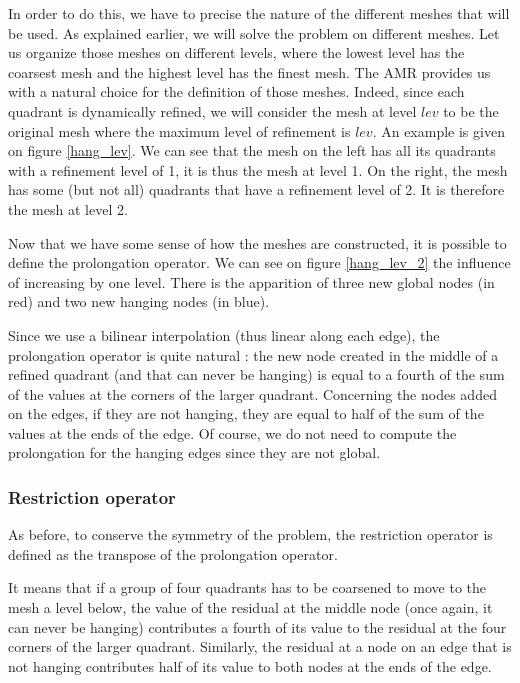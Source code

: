 In order to do this, we have to precise the nature of the different meshes that will be used. As explained earlier, we will solve the problem on different meshes. Let us organize those meshes on different levels, where the lowest level has the coarsest mesh and the highest level has the finest mesh.  The AMR provides us with a natural choice for the definition of those meshes. Indeed, since each quadrant is dynamically refined, we will consider the mesh at level $lev$ to be the original mesh where the maximum level of refinement is $lev$. An example is given on figure \ref{hang_lev}. We can see that the mesh on the left has all its quadrants with a refinement level of 1, it is thus the mesh at level 1. On the right, the mesh has some (but not all) quadrants that have a refinement level of 2. It is therefore the mesh at level 2. 

Now that we have some sense of how the meshes are constructed, it is possible to define the prolongation operator. We can see on figure \ref{hang_lev_2} the influence of increasing by one level. There is the apparition of three new global nodes (in red) and two new hanging nodes (in blue).

Since we use a bilinear interpolation (thus linear along each edge), the prolongation operator is quite natural : the new node created in the middle of a refined quadrant (and that can never be hanging) is equal to a fourth of the sum of the values at the corners of the larger quadrant. Concerning the nodes added on the edges, if they are not hanging, they are equal to half of the sum of the values at the ends of the edge. Of course, we do not need to compute the prolongation for the hanging edges since they are not global. 

\subsubsection{Restriction operator}

As before, to conserve the symmetry of the problem, the restriction operator is defined as the transpose of the prolongation operator. 

It means that if a group of four quadrants has to be coarsened to move to the mesh a level below, the value of the residual at the middle node (once again, it can never be hanging) contributes a fourth of its value to the residual at the four corners of the larger quadrant. Similarly, the residual at a node on an edge that is not hanging contributes half of its value to both nodes at the ends of the edge. 

